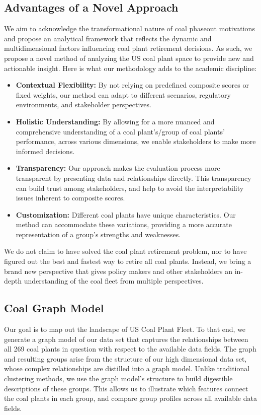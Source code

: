 \documentclass{article}
\begin{document}
\subsection{Advantages of a Novel Approach}
We aim to acknowledge the transformational nature of coal phaseout motivations and propose an analytical framework that reflects the dynamic and multidimensional factors influencing coal plant retirement decisions. As such, we propose a novel method of analyzing the US coal plant space to provide new and actionable insight. Here is what our methodology adds to the academic discipline:

\begin{itemize}
    \item \textbf{Contextual Flexibility:} By not relying on predefined composite scores or fixed weights, our method can adapt to different scenarios, regulatory environments, and stakeholder perspectives.
    \item \textbf{Holistic Understanding:} By allowing for a more nuanced and comprehensive understanding of a coal plant's/group of coal plants' performance, across various dimensions, we enable stakeholders to make more informed decisions.
    \item \textbf{Transparency:} Our approach makes the evaluation process more transparent by presenting data and relationships directly. This transparency can build trust among stakeholders, and help to avoid the interpretability issues inherent to composite scores.
    \item \textbf{Customization:} Different coal plants have unique characteristics. Our method can accommodate these variations, providing a more accurate representation of a group's strengths and weaknesses.
\end{itemize}

We do not claim to have solved the coal plant retirement problem, nor to have figured out the best and fastest way to retire all coal plants. Instead, we bring a brand new perspective that gives policy makers and other stakeholders an in-depth understanding of the coal fleet from multiple perspectives.

\subsection{Coal Graph Model}
Our goal is to map out the landscape of US Coal Plant Fleet. To that end, we generate a graph model of our data set that captures the relationships between all 269 coal plants in question with respect to the available data fields. The graph and resulting groups arise from the structure of our high dimensional data set, whose complex relationships are distilled into a graph model. Unlike traditional clustering methods, we use the graph model’s structure to build digestible descriptions of these groups. This allows us to illustrate which features connect the coal plants in each group, and compare group profiles across all available data fields.
\end{document}
